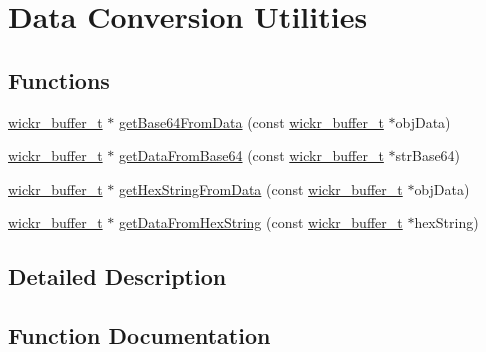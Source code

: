 \hypertarget{group__data__conversion__utilities}{}\section{Data Conversion Utilities}
\label{group__data__conversion__utilities}
\subsection*{Functions}
\begin{DoxyCompactItemize}
\item 
\mbox{\hyperlink{structwickr__buffer}{wickr\+\_\+buffer\+\_\+t}} $\ast$ \mbox{\hyperlink{group__data__conversion__utilities_gae495c13035861b3410a4c19123e6cbde}{get\+Base64\+From\+Data}} (const \mbox{\hyperlink{structwickr__buffer}{wickr\+\_\+buffer\+\_\+t}} $\ast$obj\+Data)
\item 
\mbox{\hyperlink{structwickr__buffer}{wickr\+\_\+buffer\+\_\+t}} $\ast$ \mbox{\hyperlink{group__data__conversion__utilities_ga5441647c0e13fec49a4ef4b97513a515}{get\+Data\+From\+Base64}} (const \mbox{\hyperlink{structwickr__buffer}{wickr\+\_\+buffer\+\_\+t}} $\ast$str\+Base64)
\item 
\mbox{\hyperlink{structwickr__buffer}{wickr\+\_\+buffer\+\_\+t}} $\ast$ \mbox{\hyperlink{group__data__conversion__utilities_ga436efe786b59b2c46ad39a29255f2ecf}{get\+Hex\+String\+From\+Data}} (const \mbox{\hyperlink{structwickr__buffer}{wickr\+\_\+buffer\+\_\+t}} $\ast$obj\+Data)
\item 
\mbox{\hyperlink{structwickr__buffer}{wickr\+\_\+buffer\+\_\+t}} $\ast$ \mbox{\hyperlink{group__data__conversion__utilities_ga1ca57ec73a4daf858c3721569ab7feeb}{get\+Data\+From\+Hex\+String}} (const \mbox{\hyperlink{structwickr__buffer}{wickr\+\_\+buffer\+\_\+t}} $\ast$hex\+String)
\end{DoxyCompactItemize}


\subsection{Detailed Description}


\subsection{Function Documentation}
\mbox{\label{group__data__conversion__utilities_gae495c13035861b3410a4c19123e6cbde}} 
